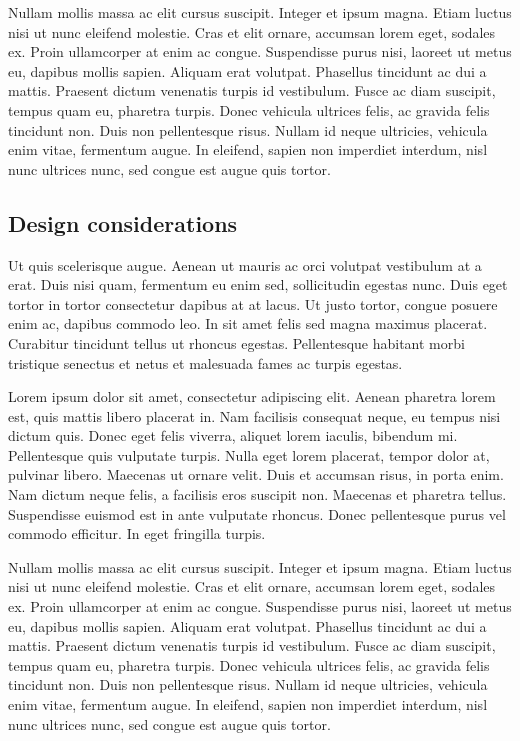 \documentclass[article]{ojbs}  %
\begin{document}
Nullam mollis massa ac elit cursus suscipit. Integer et ipsum magna. Etiam luctus nisi ut nunc eleifend molestie. Cras et elit ornare, accumsan lorem eget, sodales ex. Proin ullamcorper at enim ac congue. Suspendisse purus nisi, laoreet ut metus eu, dapibus mollis sapien. Aliquam erat volutpat. Phasellus tincidunt ac dui a mattis. Praesent dictum venenatis turpis id vestibulum. Fusce ac diam suscipit, tempus quam eu, pharetra turpis. Donec vehicula ultrices felis, ac gravida felis tincidunt non. Duis non pellentesque risus. Nullam id neque ultricies, vehicula enim vitae, fermentum augue. In eleifend, sapien non imperdiet interdum, nisl nunc ultrices nunc, sed congue est augue quis tortor.

\subsection{Design considerations}\label{design-considerations}

Ut quis scelerisque augue. Aenean ut mauris ac orci volutpat vestibulum at a erat. Duis nisi quam, fermentum eu enim sed, sollicitudin egestas nunc. Duis eget tortor in tortor consectetur dapibus at at lacus. Ut justo tortor, congue posuere enim ac, dapibus commodo leo. In sit amet felis sed magna maximus placerat. Curabitur tincidunt tellus ut rhoncus egestas. Pellentesque habitant morbi tristique senectus et netus et malesuada fames ac turpis egestas.

Lorem ipsum dolor sit amet, consectetur adipiscing elit. Aenean pharetra lorem est, quis mattis libero placerat in. Nam facilisis consequat neque, eu tempus nisi dictum quis. Donec eget felis viverra, aliquet lorem iaculis, bibendum mi. Pellentesque quis vulputate turpis. Nulla eget lorem placerat, tempor dolor at, pulvinar libero. Maecenas ut ornare velit. Duis et accumsan risus, in porta enim. Nam dictum neque felis, a facilisis eros suscipit non. Maecenas et pharetra tellus. Suspendisse euismod est in ante vulputate rhoncus. Donec pellentesque purus vel commodo efficitur. In eget fringilla turpis.

Nullam mollis massa ac elit cursus suscipit. Integer et ipsum magna. Etiam luctus nisi ut nunc eleifend molestie. Cras et elit ornare, accumsan lorem eget, sodales ex. Proin ullamcorper at enim ac congue. Suspendisse purus nisi, laoreet ut metus eu, dapibus mollis sapien. Aliquam erat volutpat. Phasellus tincidunt ac dui a mattis. Praesent dictum venenatis turpis id vestibulum. Fusce ac diam suscipit, tempus quam eu, pharetra turpis. Donec vehicula ultrices felis, ac gravida felis tincidunt non. Duis non pellentesque risus. Nullam id neque ultricies, vehicula enim vitae, fermentum augue. In eleifend, sapien non imperdiet interdum, nisl nunc ultrices nunc, sed congue est augue quis tortor.
\end{document}

